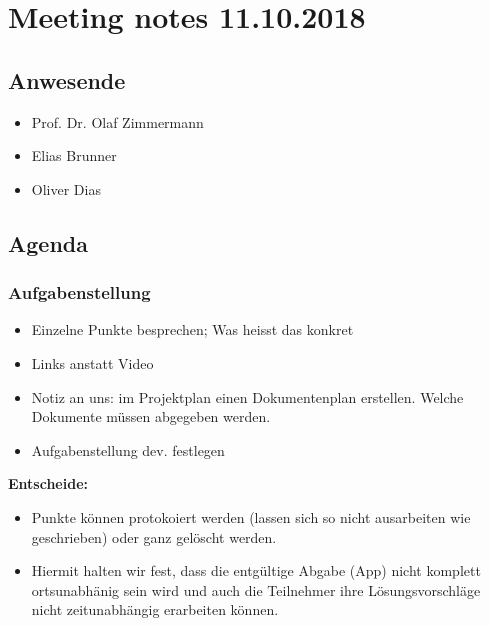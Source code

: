 \hypertarget{meeting-notes-11.10.2018}{%
\section*{Meeting notes 11.10.2018}\label{meeting-notes-11.10.2018}}

\hypertarget{anwesende}{%
\subsection*{Anwesende}\label{anwesende}}

\begin{itemize}

\item
  Prof. Dr. Olaf Zimmermann
\item
  Elias Brunner
\item
  Oliver Dias
\end{itemize}

\hypertarget{agenda}{%
\subsection*{Agenda}\label{agenda}}

\hypertarget{aufgabenstellung}{%
\subsubsection*{Aufgabenstellung}\label{aufgabenstellung}}

\begin{itemize}

\item
  Einzelne Punkte besprechen; Was heisst das konkret
\item
  Links anstatt Video
\item
  Notiz an uns: im Projektplan einen Dokumentenplan erstellen. Welche
  Dokumente müssen abgegeben werden.
\item
  Aufgabenstellung dev. festlegen
\end{itemize}

\textbf{Entscheide:}

\begin{itemize}

\item
  Punkte können protokoiert werden (lassen sich so nicht ausarbeiten wie
  geschrieben) oder ganz gelöscht werden.
\item
  Hiermit halten wir fest, dass die entgültige Abgabe (App) nicht
  komplett ortsunabhänig sein wird und auch die Teilnehmer ihre
  Lösungsvorschläge nicht zeitunabhängig erarbeiten können.
\end{itemize}

